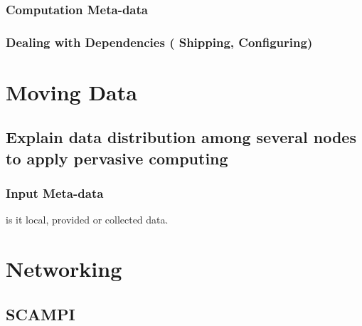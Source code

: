 \subsubsection{Computation Meta-data}
\subsubsection{Dealing with Dependencies ( Shipping, Configuring)}


\section{Moving Data}
\subsection{Explain data distribution among several nodes to apply pervasive computing}

\subsubsection{Input Meta-data}
is it local, provided or collected data.

\section{Networking}
\subsection{SCAMPI }







